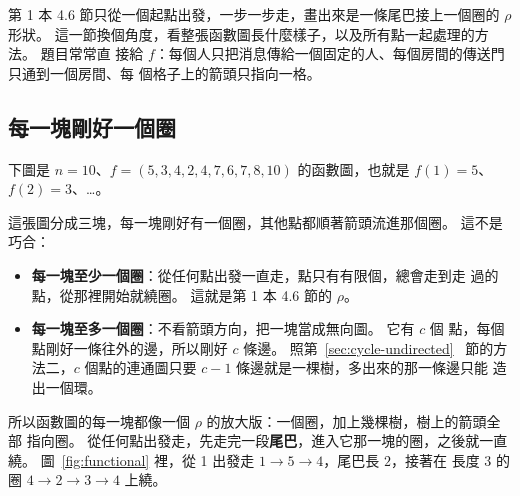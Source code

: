 第 1 本 4.6 節只從一個起點出發，一步一步走，畫出來是一條尾巴接上一個圈的 $\rho$ 形狀。
這一節換個角度，看整張函數圖長什麼樣子，以及所有點一起處理的方法。 題目常常直
接給 $f$：每個人只把消息傳給一個固定的人、每個房間的傳送門只通到一個房間、每
個格子上的箭頭只指向一格。

\subsection{每一塊剛好一個圈}

下圖是 $n = 10$、$f = (5, 3, 4, 2, 4, 7, 6, 7, 8, 10)$ 的函數圖，也就是
$f(1) = 5$、$f(2) = 3$、\ldots。

\begin{center}
\label{fig:functional}
\end{center}

這張圖分成三塊，每一塊剛好有一個圈，其他點都順著箭頭流進那個圈。 這不是巧合：

\begin{itemize}
\item \textbf{每一塊至少一個圈}：從任何點出發一直走，點只有有限個，總會走到走
過的點，從那裡開始就繞圈。 這就是第 1 本 4.6 節的 $\rho$。
\item \textbf{每一塊至多一個圈}：不看箭頭方向，把一塊當成無向圖。 它有 $c$ 個
點，每個點剛好一條往外的邊，所以剛好 $c$ 條邊。 照第~\ref{sec:cycle-undirected}~
節的方法二，$c$ 個點的連通圖只要 $c - 1$ 條邊就是一棵樹，多出來的那一條邊只能
造出一個環。
\end{itemize}

所以函數圖的每一塊都像一個 $\rho$ 的放大版：一個圈，加上幾棵樹，樹上的箭頭全部
指向圈。 從任何點出發走，先走完一段\textbf{尾巴}，進入它那一塊的圈，之後就一直
繞。 圖~\ref{fig:functional} 裡，從 1 出發走 $1 \to 5 \to 4$，尾巴長 $2$，接著在
長度 $3$ 的圈 $4 \to 2 \to 3 \to 4$ 上繞。

